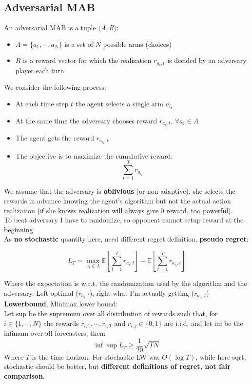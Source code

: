 \subsection{Adversarial MAB}
    An adversarial MAB is a tuple $\langle A,R\rangle$:
    \begin{itemize}
        \item $A=\{a_1,\cdots,a_N\}$ is a set of $N$ possible arms (choices)
        \item $R$ is a reward vector for which the realization $r_{a_i,t}$ is decided by an adversary player each turn
    \end{itemize}
    We consider the following process:
    \begin{itemize}
        \item At each time step $t$ the agent selects a single arm $a_{i_t}$
        \item At the same time the adversary chooses reward $r_{a_i,t},\,\forall a_i\in A$
        \item The agent gets the reward $r_{a_{i_t},r}$
        \item The objective is to maximize the cumulative reward:
        $$\sum_{t=1}^Tr_{a_{i_t}}$$
    \end{itemize}
    We assume that the adversary is \textbf{oblivious} (or non-adaptive), she selects the rewards in advance knowing the agent's algorithm but not the actual action realization (if she knows realization will always give 0 reward, too powerful).\\
    To beat adversary I have to randomize, so opponent cannot setup reward at the beginning.\\
    As \textbf{no stochastic} quantity here, need different regret definition, \textbf{pseudo regret}:
    \begin{LARGE}
        $$L_T=\max_{a_i\in A}\mathbb{E}\left[\sum_{t=1}^Tr_{a_i,t}\right]-\mathbb{E}\left[\sum_{t=1}^Tr_{a_{i_t},t}\right]$$
    \end{LARGE}
    Where the expectation is w.r.t. the randomization used by the algorithm and the adversary. Left optimal ($r_{a_i,t}$), right what I'm actually getting ($r_{a_{i_t},t}$)\\
    \textbf{Lowerbound}, Minimax lower bound:\\
    Let sup be the supremum over all distribution of rewards such that, for $i\in \{1,\cdots,N\}$ the rewards $r_{i,1},\cdots,r_{i,T}$ and $r_{i,j}\in\{0,1\}$ are i.i.d. and let inf be the infimum over all forecasters, then:
    $$\inf\sup L_T\geq \frac{1}{20}\sqrt{TN}$$
    Where $T$ is the time horizon. For stochastic LW was $O(\log T)$, while here sqrt, stochastic should be better, but \textbf{different definitions of regret, not fair comparison}.
